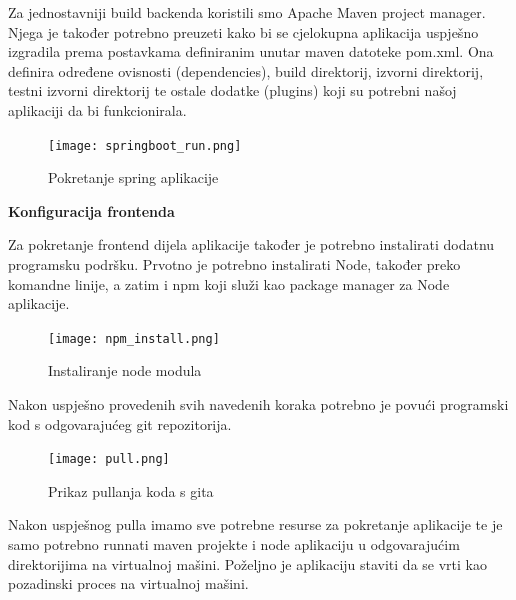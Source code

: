     Za jednostavniji build backenda koristili smo Apache Maven project manager. Njega je također potrebno preuzeti kako bi se cjelokupna aplikacija uspješno izgradila prema postavkama definiranim unutar maven datoteke pom.xml. Ona definira određene ovisnosti (dependencies), build direktorij, izvorni direktorij, testni izvorni direktorij te ostale dodatke (plugins) koji su potrebni našoj aplikaciji da bi funkcionirala.
    \begin{figure}[H]
			\texttt{[image: springboot\_run.png]}
			\caption{Pokretanje spring aplikacije}
			\label{fig:spring}
		\end{figure}
    

    \textbf{Konfiguracija frontenda}

		Za pokretanje frontend dijela aplikacije također je potrebno instalirati dodatnu programsku podršku. Prvotno je potrebno instalirati Node, također preko komandne linije, a zatim i npm koji služi kao package manager za Node aplikacije.
    \newline
    \newline
    
      \begin{figure}[H]
			\texttt{[image: npm\_install.png]}
			\caption{Instaliranje node modula}
			\label{fig:npm}
		\end{figure}

    Nakon uspješno provedenih svih navedenih koraka potrebno je povući programski kod s odgovarajućeg git repozitorija.
    \begin{figure}[H]
			\texttt{[image: pull.png]}
			\caption{Prikaz pullanja koda s gita}
			\label{fig:pull}
		\end{figure}
  Nakon uspješnog pulla imamo sve potrebne resurse za pokretanje aplikacije te je samo potrebno runnati maven projekte i node aplikaciju u odgovarajućim direktorijima na virtualnoj mašini. Poželjno je aplikaciju staviti da se vrti kao pozadinski proces na virtualnoj mašini.

			\eject 